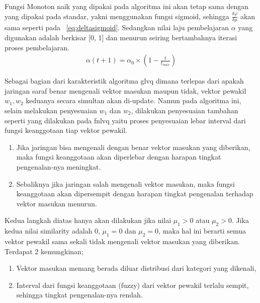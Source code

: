 Fungsi Monoton naik yang dipakai pada algoritma ini akan tetap sama dengan yang
dipakai pada \glvq standar, yakni menggunakan fungsi sigmoid, sehingga
$\frac{\delta \varphi}{\delta \mu}$ akan sama seperti pada
\equ~\ref{eq:deltasigmoid}. Sedangkan nilai laju pembelajaran $\alpha$ yang
digunakan adalah berkisar [0, 1] dan menurun seiring bertambahnya iterasi proses
pembelajaran. 
\begin{align}
\label{eq:alpha}
	\alpha(t+1) = \alpha_0 \times (1 - \frac{t}{t_{max}})
\end{align}

Sebagai bagian dari karakteristik algoritma \gls{glvq} dimana terlepas dari
apakah jaringan saraf benar mengenali vektor masukan maupun tidak, vektor
pewakil $w_1, w_2$ keduanya secara simultan akan di-update. Namun pada algoritma
ini, selain melakukan penyesuaian $w_1$ dan $w_2$, dilakukan penyesuaian
tambahan seperti yang dilakukan pada \gls{fnlvq} yaitu proses penyesuaian
lebar interval dari fungsi keanggotaan tiap vektor pewakil. 
\begin{enumerate}
  \setlength{\itemsep}{1pt}
  \setlength{\parskip}{0pt}
  \setlength{\parsep}{0pt}
  \item Jika jaringan bisa mengenali dengan benar vektor masukan yang diberikan,
  maka fungsi keanggotaan akan diperlebar dengan harapan tingkat pengenalan-nya
  meningkat. 
  \item Sebaliknya jika jaringan salah mengenali vektor masukan, maka fungsi
  keanggotaan akan dipersempit dengan harapan tingkat pengenalan terhadap 
  vektor masukan menurun. 
\end{enumerate}

\noindent Kedua langkah diatas hanya akan dilakukan jika nilai $\mu_1 > 0$ atau
$\mu_2 > 0$. Jika  kedua nilai similarity adalah 0, $\mu_1=0$ dan $\mu_2=0$, 
maka hal ini berarti semua vektor pewakil sama sekali tidak mengenali vektor 
masukan yang diberikan. Terdapat 2 kemungkinan; 
\begin{enumerate}
  \setlength{\itemsep}{1pt}
  \setlength{\parskip}{0pt}
  \setlength{\parsep}{0pt}
  \item Vektor masukan memang berada diluar distribusi dari kategori yang
  dikenali, 
  \item Interval dari fungsi keanggotaan (fuzzy) dari vektor pewakil
  terlalu sempit, sehingga tingkat pengenalan-nya rendah. 
\end{enumerate}

